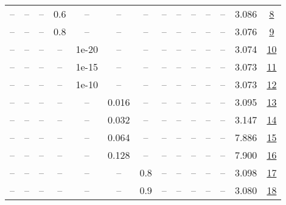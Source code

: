 \begin{table}[H]
\begin{tabular}{cccccccccccccc}
-- & -- & -- & 0.6 & -- & -- & -- & -- & -- & -- & -- & -- & 3.086 & \href{https://wandb.ai/stanford-mercury/optimizer-scaling/runs/sweep-520m-10B-muon8eb81clr0.008-wd0.1-minlr0-warmup0-b10.8-b20.-35dedc}{8} \\
-- & -- & -- & 0.8 & -- & -- & -- & -- & -- & -- & -- & -- & 3.076 & \href{https://wandb.ai/stanford-mercury/optimizer-scaling/runs/sweep-520m-10B-muon3d94a7lr0.008-wd0.1-minlr0-warmup0-b10.8-b20.-636a88}{9} \\
-- & -- & -- & -- & 1e-20 & -- & -- & -- & -- & -- & -- & -- & 3.074 & \href{https://wandb.ai/stanford-mercury/optimizer-scaling/runs/sweep-520m-10B-muonfc4dd7lr0.008-wd0.1-minlr0-warmup0-b10.8-b20.-fa6779}{10} \\
-- & -- & -- & -- & 1e-15 & -- & -- & -- & -- & -- & -- & -- & 3.073 & \href{https://wandb.ai/stanford-mercury/optimizer-scaling/runs/sweep-520m-10B-muon284dcblr0.008-wd0.1-minlr0-warmup0-b10.8-b20.-913bb6}{11} \\
-- & -- & -- & -- & 1e-10 & -- & -- & -- & -- & -- & -- & -- & 3.073 & \href{https://wandb.ai/stanford-mercury/optimizer-scaling/runs/sweep-520m-10B-muonc71f70lr0.008-wd0.1-minlr0-warmup0-b10.8-b20.-634a5c}{12} \\
-- & -- & -- & -- & -- & 0.016 & -- & -- & -- & -- & -- & -- & 3.095 & \href{https://wandb.ai/stanford-mercury/optimizer-scaling/runs/sweep-520m-10B-muon2ead91lr0.016-wd0.1-minlr0-warmup0-b10.8-b20.-d03e40}{13} \\
-- & -- & -- & -- & -- & 0.032 & -- & -- & -- & -- & -- & -- & 3.147 & \href{https://wandb.ai/stanford-mercury/optimizer-scaling/runs/sweep-520m-10B-muonf91fealr0.032-wd0.1-minlr0-warmup0-b10.8-b20.-531812}{14} \\
-- & -- & -- & -- & -- & 0.064 & -- & -- & -- & -- & -- & -- & 7.886 & \href{https://wandb.ai/stanford-mercury/optimizer-scaling/runs/sweep-520m-10B-muond9755blr0.064-wd0.1-minlr0-warmup0-b10.8-b20.-46abb1}{15} \\
-- & -- & -- & -- & -- & 0.128 & -- & -- & -- & -- & -- & -- & 7.900 & \href{https://wandb.ai/stanford-mercury/optimizer-scaling/runs/sweep-520m-10B-muon16543clr0.128-wd0.1-minlr0-warmup0-b10.8-b20.-225a93}{16} \\
-- & -- & -- & -- & -- & -- & 0.8 & -- & -- & -- & -- & -- & 3.098 & \href{https://wandb.ai/stanford-mercury/optimizer-scaling/runs/sweep-520m-10B-muon21d94elr0.008-wd0.1-minlr0-warmup0-b10.8-b20.-f4bbef}{17} \\
-- & -- & -- & -- & -- & -- & 0.9 & -- & -- & -- & -- & -- & 3.080 & \href{https://wandb.ai/stanford-mercury/optimizer-scaling/runs/sweep-520m-10B-muon1de198lr0.008-wd0.1-minlr0-warmup0-b10.8-b20.-2eb67f}{18} \\

\end{tabular}
\end{table}
